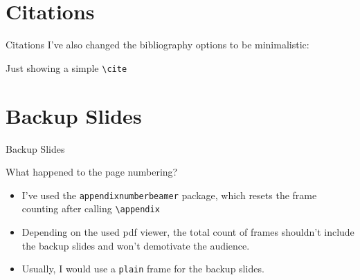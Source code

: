 \documentclass[aspectratio=169]{beamer}                    %
\begin{document}
\section{Citations}
\begin{frame}{Citations}
    I've also changed the bibliography options to be minimalistic:

    Just showing a simple \texttt{\textbackslash{}cite} \cite{AlexNet}
    \vfill
    \printbibliography
\end{frame}

\appendix %
\section*{Backup Slides}
\begin{frame}
    \centering
    \vfill
    {\fontsize{40}{50}\selectfont Backup Slides}
    \vfill
\end{frame}

\begin{frame}{What happened to the page numbering?}
    \begin{itemize}
        \item I've used the \texttt{appendixnumberbeamer}
              package, which resets the frame counting after calling
              \texttt{\textbackslash{}appendix}
        \item Depending on the used pdf viewer, the total
              count of frames shouldn't include the backup slides and
              won't demotivate the audience.
        \item Usually, I would use a \texttt{plain} frame
              for the backup slides.
    \end{itemize}
\end{frame}
\end{document}

